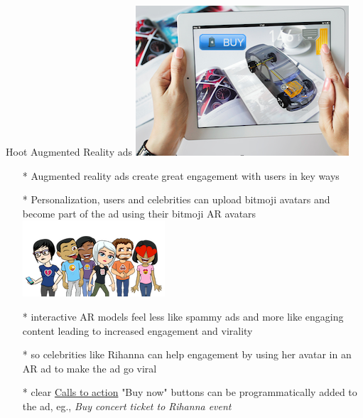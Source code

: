 \documentclass[12pt]{beamer}
\begin{document}
\begin{frame}[t]{Hoot Augmented Reality ads \includegraphics[scale=.1]{static/arad/arad5}} 
\begin{itemize}
\item[*]Augmented reality ads create great engagement with users in key ways
\pause
\item[*]Personalization, users and celebrities can upload bitmoji avatars and become part of the ad using their bitmoji AR avatars 
\pause
\includegraphics[scale=.15]{static/arad/bitmoji} 
\pause
\item[*]interactive AR models feel  less like spammy ads and more like engaging content leading to increased engagement and virality 
\pause	
\item[*]so celebrities like Rihanna can help engagement by using her avatar in an AR ad to make the ad go viral 
\pause
\item[*]clear \underline{Calls to action} "Buy now" buttons can be programmatically added to the ad, eg., \emph{ Buy concert ticket to Rihanna event}
\end{itemize}
\end{frame}
\end{document}
